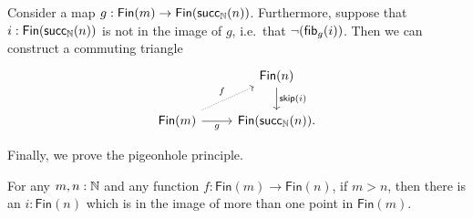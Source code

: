 \begin{lem}
  Consider a map $g:\mathsf{Fin}(m)\to\mathsf{Fin}(\mathsf{succ}_{{\mathbb{N}}}(n))$. Furthermore, suppose that $i:\mathsf{Fin}(\mathsf{succ}_{{\mathbb{N}}}(n))$ is not in the image of $g$, i.e.~that $\neg(\mathsf{fib}_{g}(i))$. Then we can construct a commuting triangle
  \begin{equation*}
    \begin{tikzcd}
      & \mathsf{Fin}(n) \arrow[d,"\mathsf{skip}(i)"] \\
      \mathsf{Fin}(m) \arrow[r,swap,"g"] \arrow[ur,densely dotted,"f"] & \mathsf{Fin}(\succN(n)).
    \end{tikzcd}
  \end{equation*}
\end{lem}

Finally, we prove the pigeonhole principle.

\begin{thm}\label{thm:pigeonhole}
  For any $m,n:{\mathbb{N}}$ and any function $f:\mathsf{Fin}(m)\to\mathsf{Fin}(n)$, if $m>n$, then there is an $i:\mathsf{Fin}(n)$ which is in the image of more than one point in $\mathsf{Fin}(m)$.
\end{thm}

